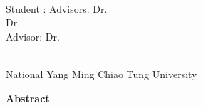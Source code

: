 \begin{center}
    \large
    
    \begin{singlespace}
        \textbf{\englishTitle{}} \\[0.5cm]
    \end{singlespace}
    
    \begin{singlespace}
        Student : \studentEnName{}  \hspace{1.0cm} 
        \ifdefined\advisorCnNameB
            Advisors: Dr.\, \advisorEnName \\
            \hspace{8.2cm} Dr.\, \advisorEnNameB  \\
        \else
            Advisor: Dr.\, \advisorEnName \\
        \fi
    \end{singlespace}
    
    \vspace{0.3cm}
    \begin{singlespace}
        \DepartInstitEnName\\
        National Yang Ming Chiao Tung University\\[0.3cm]
    \end{singlespace}
    
    \textbf{Abstract} \\[0.3cm]

\end{center}

\normalsize 

